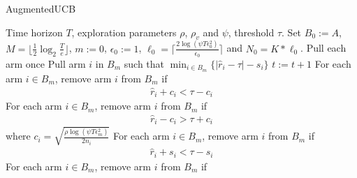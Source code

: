 \begin{algorithm}[th!]
\caption{AugmentedUCB}
\label{alg:augucb}
\begin{algorithmic}
 Time horizon $T$, exploration parameters $\rho$, $\rho_v$ and $\psi$, threshold $\tau$.
 Set $B_{0}:=A$, $M=\bigg\lfloor \frac{1}{2}\log_{2} \frac{T}{e}\bigg\rfloor $, $m:=0$, $\epsilon_{0}:=1$, $\ell_{0}=\big\lceil \frac{2\log(\psi T\epsilon_{0}^{2})}{\epsilon_{0}} \big\rceil$ and $N_{0}=K*\ell_{0} $.
\State Pull each arm once
\State {}
\State Pull arm $i$ in $B_m$ such that $\min_{i\in B_{m}}\bigg\lbrace |\hat{r}_{i} - \tau | - s_{i}\bigg\rbrace$
\State $t:=t+1$ 
\ArmElim
\State For each arm $i \in B_{m}$, remove arm ${i}$ from $B_{m}$ if
\begin{align*}
\hat{r}_{i} + c_i  < \tau - c_i
\end{align*}
\State For each arm $i \in B_{m}$, remove arm ${i}$ from $B_{m}$ if
\begin{align*}
\hat{r}_{i} - c_i  > \tau + c_i
\end{align*}
where $ c_i=\sqrt{\frac{\rho\log{(\psi T\epsilon_{m}^{2})}}{2 n_{i}}} $
\EndArmElim
\ArmElimV
\State For each arm $i \in B_{m}$, remove arm ${i}$ from $B_{m}$ if
\begin{align*}
\hat{r}_{i} + s_i  < \tau - s_i 
\end{align*}
\State For each arm $i \in B_{m}$, remove arm ${i}$ from $B_{m}$ if
\begin{align*}

\end{align*}
\end{algorithmic}
\end{algorithm}
